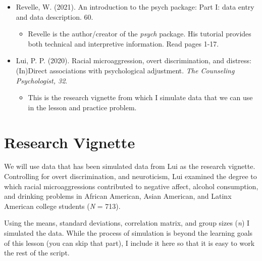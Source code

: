 \documentclass[
  11pt,
]{book}
\providecommand{\tightlist}{%
  \setlength{\itemsep}{0pt}\setlength{\parskip}{0pt}}
\begin{document}
\begin{itemize}
\tightlist
\item
  Revelle, W. (2021). An introduction to the psych package: Part I: data entry and data description. 60.

  \begin{itemize}
  \tightlist
  \item
    Revelle is the author/creator of the \emph{psych} package. His tutorial provides both technical and interpretive information. Read pages 1-17.
  \end{itemize}
\item
  Lui, P. P. (2020). Racial microaggression, overt discrimination, and distress: (In)Direct associations with psychological adjustment. \emph{The Counseling Psychologist, 32}.

  \begin{itemize}
  \tightlist
  \item
    This is the research vignette from which I simulate data that we can use in the lesson and practice problem.
  \end{itemize}
\end{itemize}

\hypertarget{research-vignette}{%
\section{Research Vignette}\label{research-vignette}}

We will use data that has been simulated data from Lui \citeyearpar{lui_racial_2020} as the research vignette. Controlling for overt discrimination, and neuroticism, Lui examined the degree to which racial microaggressions contributed to negative affect, alcohol consumption, and drinking problems in African American, Asian American, and Latinx American college students (\emph{N} = 713).

Using the means, standard deviations, correlation matrix, and group sizes (\emph{n}) I simulated the data. While the process of simulation is beyond the learning goals of this lesson (you can skip that part), I include it here so that it is easy to work the rest of the script.
\end{document}
